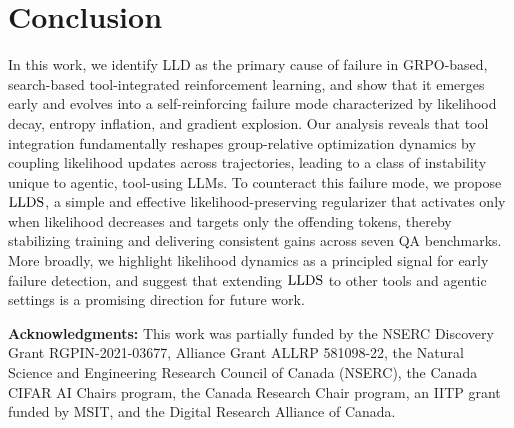 \documentclass{article}
\theoremstyle{plain}
\theoremstyle{definition}
\theoremstyle{remark}
\newcommand{\ours}{$\rm LLDS$}
\begin{document}
\printAffiliationsAndNotice{}  %










\vspace{-1mm}
\section{Conclusion}
In this work, we identify LLD as the primary cause of failure in GRPO-based, search-based tool-integrated reinforcement learning, and show that it emerges early and evolves into a self-reinforcing failure mode characterized by likelihood decay, entropy inflation, and gradient explosion. Our analysis reveals that tool integration fundamentally reshapes group-relative optimization dynamics by coupling likelihood updates across trajectories, leading to a class of instability unique to agentic, tool-using LLMs. To counteract this failure mode, we propose \ours{}, a simple and effective likelihood-preserving regularizer that activates only when likelihood decreases and targets only the offending tokens, thereby stabilizing training and delivering consistent gains across seven QA benchmarks. More broadly, we highlight likelihood dynamics as a principled signal for early failure detection, and suggest that extending \ours{} to other tools and agentic settings is a promising direction for future work.

\textbf{Acknowledgments:} This work was partially funded by the NSERC Discovery Grant RGPIN-2021-03677, Alliance Grant ALLRP 581098-22, the Natural Science and Engineering Research Council of Canada
(NSERC), the Canada CIFAR AI Chairs program, the Canada Research Chair program, an IITP grant funded by MSIT, and the Digital Research Alliance of Canada.



\clearpage
\appendix
\onecolumn

\end{document}
